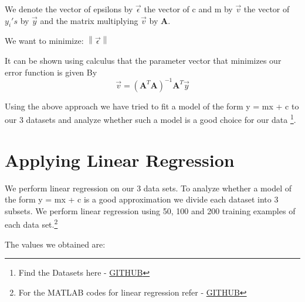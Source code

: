 \documentclass[14pt]{article}
\begin{document}
    \noindent We denote the vector of epsilons by $ \vec{\epsilon} $ the vector of c and m by $ \vec{v} $ the vector of $ y_{i}'s $ by $ \vec{y} $ and the matrix multiplying $ \vec{v} $ by $ \textbf{A} $.

    \noindent We want to minimize:
    $ \left\lVert \vec{\epsilon} \right\rVert $


    \noindent It can be shown using calculus that the parameter vector that minimizes our error function is given By
    \[ \vec{v} = (\textbf{A}^{T} \textbf{A})^{-1} \textbf{A}^{T} \vec{y} \]


    Using the above approach we have tried to fit a model of the form y = mx + c to our 3 datasets and analyze whether such a model is a good choice for our data \footnote[2]{Find the Datasets here - \url{GITHUB}}.




    \huge
    \section{Applying Linear Regression}
    \normalsize
    We perform linear regression on our 3 data sets. To analyze whether a model of the form y = mx + c is a good approximation we divide each dataset into 3 subsets. We perform linear regression using 50, 100 and 200 training examples of each data set.\footnote[8]{For the MATLAB codes for linear regression refer - \url{GITHUB}}

    \noindent The values we obtained are: \\
\end{document}
